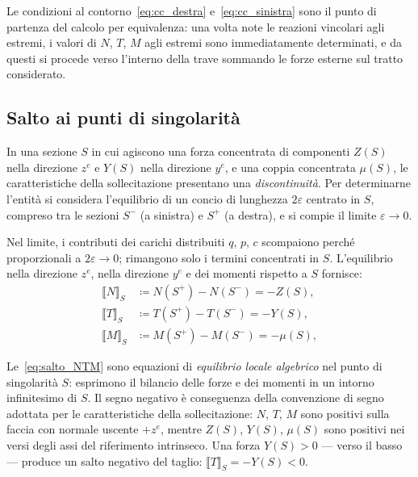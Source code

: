 \begin{oss}
	Le condizioni al contorno~\eqref{eq:cc_destra}
	e~\eqref{eq:cc_sinistra} sono il punto di
	partenza del calcolo per equivalenza: una volta
	note le reazioni vincolari agli estremi, i valori
	di $N$, $T$, $M$ agli estremi sono immediatamente
	determinati, e da questi si procede verso
	l'interno della trave sommando le forze esterne
	sul tratto considerato.
\end{oss}






\subsection{Salto ai punti di singolarità}
\label{sec:salto_singolarita}

In una sezione $S$ in cui agiscono una forza
concentrata di componenti $Z(S)$ nella direzione
$z^e$ e $Y(S)$ nella direzione $y^e$, e una coppia
concentrata $\mu(S)$, le caratteristiche della
sollecitazione presentano una \emph{discontinuità}.
Per determinarne l'entità si considera l'equilibrio
di un concio di lunghezza $2\varepsilon$ centrato
in $S$, compreso tra le sezioni $S^-$ (a sinistra)
e $S^+$ (a destra), e si compie il limite
$\varepsilon \to 0$.

Nel limite, i contributi dei carichi distribuiti
$q$, $p$, $c$ scompaiono perché proporzionali a
$2\varepsilon \to 0$; rimangono solo i termini
concentrati in $S$. L'equilibrio nella direzione
$z^e$, nella direzione $y^e$ e dei momenti rispetto
a $S$ fornisce:
\begin{equation}
	\boxed{\begin{aligned}
			\llbracket N \rrbracket_S &\coloneqq
			N(S^+) - N(S^-) = -Z(S),\\
			\llbracket T \rrbracket_S &\coloneqq
			T(S^+) - T(S^-) = -Y(S),\\
			\llbracket M \rrbracket_S &\coloneqq
			M(S^+) - M(S^-) = -\mu(S),
	\end{aligned}}
	\label{eq:salto_NTM}
\end{equation}

\begin{oss}
	Le~\eqref{eq:salto_NTM}
	sono equazioni di \emph{equilibrio locale
		algebrico} nel punto di singolarità $S$:
	esprimono il bilancio delle forze e dei momenti
	in un intorno infinitesimo di $S$. Il segno
	negativo è conseguenza della convenzione di
	segno adottata per le caratteristiche della
	sollecitazione: $N$, $T$, $M$ sono positivi
	sulla faccia con normale uscente $+z^e$, mentre
	$Z(S)$, $Y(S)$, $\mu(S)$ sono positivi nei
	versi degli assi del riferimento intrinseco.
	Una forza $Y(S) > 0$ --- verso il basso ---
	produce un salto negativo del taglio:
	$\llbracket T \rrbracket_S = -Y(S) < 0$.
\end{oss}



